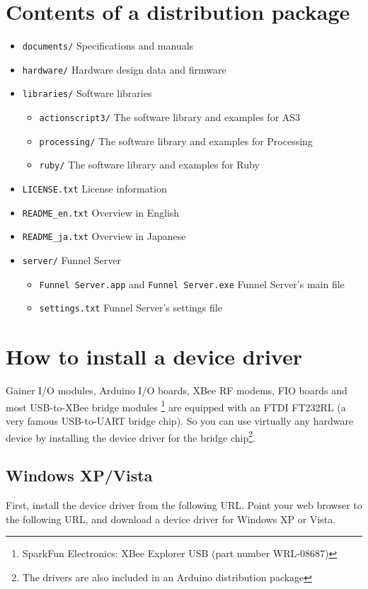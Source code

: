 \documentclass[9pt]{jsarticle}
\begin{document}
\section{Contents of a distribution package}
\begin{itemize}
\item \texttt{documents/} Specifications and manuals
\item \texttt{hardware/} Hardware design data and firmware
\item \texttt{libraries/} Software libraries
	\begin{itemize}
	\item \texttt{actionscript3/} The software library and examples for AS3
	\item \texttt{processing/} The software library and examples for Processing
	\item \texttt{ruby/} The software library and examples for Ruby
	\end{itemize}
\item \texttt{LICENSE.txt} License information
\item \texttt{README\_en.txt} Overview in English
\item \texttt{README\_ja.txt} Overview in Japanese
\item \texttt{server/} Funnel Server
	\begin{itemize}
	\item \texttt{Funnel Server.app} and \texttt{Funnel Server.exe} Funnel Server's main file
	\item \texttt{settings.txt} Funnel Server's settings file
	\end{itemize}
\end{itemize}

\section{How to install a device driver}
Gainer I/O modules, Arduino I/O boards, XBee RF modems, FIO boards and most USB-to-XBee bridge modules \footnote{SparkFun Electronics: XBee Explorer USB (part number WRL-08687)} are equipped with an FTDI FT232RL (a very famous USB-to-UART bridge chip). So you can use virtually any hardware device by installing the device driver for the bridge chip\footnote{The drivers are also included in an Arduino distribution package}.

\subsection{Windows XP/Vista}
First, install the device driver from the following URL. Point your web browser to the following URL, and download a device driver for Windows XP or Vista.
\end{document}

